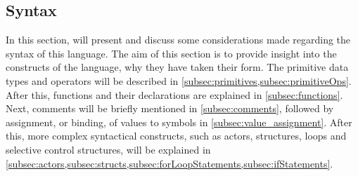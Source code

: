 \subsection{Syntax}
\label{sec:syntax}
In this section, will present and discuss some considerations made regarding the syntax of this language. The aim of this section is to provide insight into the constructs of the language, why they have taken their form.
The primitive data types and operators will be described in \cref{subsec:primitives,subsec:primitiveOps}. After this, functions and their declarations are explained in \cref{subsec:functions}. Next, comments will be briefly mentioned in \cref{subsec:comments}, followed by assignment, or binding, of values to symbols in \cref{subsec:value_assignment}. After this, more complex syntactical constructs, such as actors, structures, loops and selective control structures, will be explained in \cref{subsec:actors,subsec:structs,subsec:forLoopStatements,subsec:ifStatements}.












